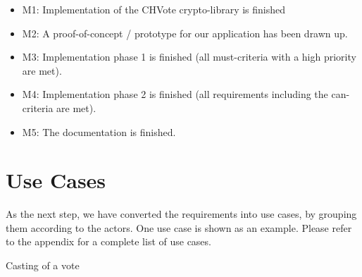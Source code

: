 \begin{itemize}
	\item M1: Implementation of the CHVote crypto-library is finished
	\item M2: A proof-of-concept / prototype for our application has been drawn up.
	\item M3: Implementation phase 1 is finished (all must-criteria with a high priority are met).
	\item M4: Implementation phase 2 is finished (all requirements including the can-criteria are met).
	\item M5: The documentation is finished.
\end{itemize}

\section{Use Cases}
As the next step, we have converted the requirements into use cases, by grouping them according to the actors. One use case is shown as an example. Please refer to the appendix for a complete list of use cases.
\begin{usecase}{Casting of a vote}
\end{usecase}
